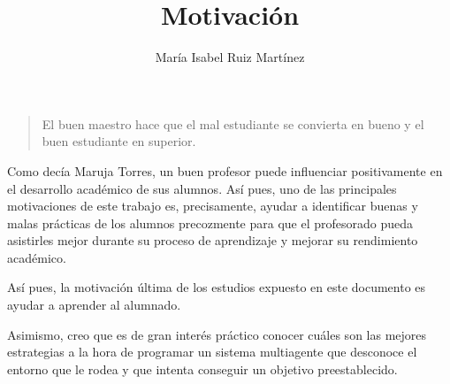 \documentclass[10pt,a4paper]{article}
\author{María Isabel Ruiz Martínez}
\title{Motivación}
\begin{document}
\maketitle

\begin{quote}
\small El buen maestro hace que el mal estudiante se convierta en bueno y el buen estudiante en superior.

\end{quote}

Como decía Maruja Torres, un buen profesor puede influenciar positivamente en el desarrollo académico de sus alumnos. Así pues, uno de las principales motivaciones de este trabajo es, precisamente, ayudar a identificar buenas y malas prácticas de los alumnos precozmente para que el profesorado pueda asistirles mejor durante su proceso de aprendizaje y mejorar su rendimiento académico.

Así pues, la motivación última de los estudios expuesto en este documento es ayudar a aprender al alumnado.

Asimismo, creo que es de gran interés práctico conocer cuáles son las mejores estrategias a la hora de programar un sistema multiagente que desconoce el entorno que le rodea y que intenta conseguir un objetivo preestablecido.
\end{document}
